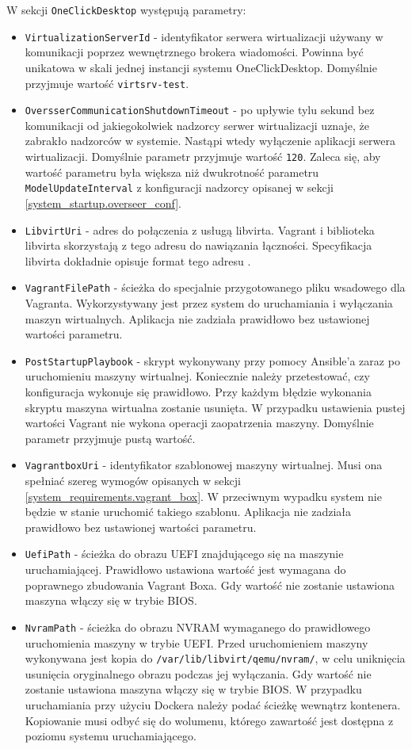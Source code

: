 \documentclass[../opis-rozwiazania.tex]{subfiles}
\begin{document}
W sekcji \texttt{OneClickDesktop} występują parametry:
\begin{itemize}
  \item \texttt{VirtualizationServerId} - identyfikator serwera wirtualizacji używany w komunikacji poprzez wewnętrznego brokera wiadomości. Powinna być unikatowa w skali jednej instancji systemu OneClickDesktop. Domyślnie przyjmuje wartość \texttt{virtsrv-test}.
  \item \texttt{OversserCommunicationShutdownTimeout} - po upływie tylu sekund bez komunikacji od jakiegokolwiek nadzorcy serwer wirtualizacji uznaje, że zabrakło nadzorców w systemie. Nastąpi wtedy wyłączenie aplikacji serwera wirtualizacji. Domyślnie parametr przyjmuje wartość \texttt{120}. Zaleca się, aby wartość parametru była większa niż dwukrotność parametru \texttt{ModelUpdateInterval} z konfiguracji nadzorcy opisanej w sekcji \ref{system_startup.overseer_conf}.
  \item \texttt{LibvirtUri} - adres do połączenia z usługą libvirta. Vagrant i biblioteka libvirta skorzystają z tego adresu do nawiązania łączności. Specyfikacja libvirta dokładnie opisuje format tego adresu \parencite{libvirt-uri}.
  \item \texttt{VagrantFilePath} - ścieżka do specjalnie przygotowanego pliku wsadowego dla Vagranta. Wykorzystywany jest przez system do uruchamiania i wyłączania maszyn wirtualnych. Aplikacja nie zadziała prawidłowo bez ustawionej wartości parametru.
  \item \texttt{PostStartupPlaybook} - skrypt wykonywany przy pomocy Ansible'a zaraz po uruchomieniu maszyny wirtualnej. Koniecznie należy przetestować, czy konfiguracja wykonuje się prawidłowo. Przy każdym błędzie wykonania skryptu maszyna wirtualna zostanie usunięta. W przypadku ustawienia pustej wartości Vagrant nie wykona operacji zaopatrzenia maszyny. Domyślnie parametr przyjmuje pustą wartość.
  \item \texttt{VagrantboxUri} - identyfikator szablonowej maszyny wirtualnej. Musi ona spełniać szereg wymogów opisanych w sekcji \ref{system_requirements.vagrant_box}. W przeciwnym wypadku system nie będzie w stanie uruchomić takiego szablonu. Aplikacja nie zadziała prawidłowo bez ustawionej wartości parametru.
  \item \texttt{UefiPath} - ścieżka do obrazu UEFI znajdującego się na maszynie uruchamiającej. Prawidłowo ustawiona wartość jest wymagana do poprawnego zbudowania Vagrant Boxa. Gdy wartość nie zostanie ustawiona maszyna włączy się w trybie BIOS.
  \item \texttt{NvramPath} - ścieżka do obrazu NVRAM wymaganego do prawidłowego uruchomienia maszyny w trybie UEFI. Przed uruchomieniem maszyny wykonywana jest kopia do \texttt{/var/lib/libvirt/qemu/nvram/}, w celu uniknięcia usunięcia oryginalnego obrazu podczas jej wyłączania. Gdy wartość nie zostanie ustawiona maszyna włączy się w trybie BIOS. W przypadku uruchamiania przy użyciu Dockera należy podać ścieżkę wewnątrz kontenera. Kopiowanie musi odbyć się do wolumenu, którego zawartość jest dostępna z poziomu systemu uruchamiającego.

\end{itemize}
\end{document}
